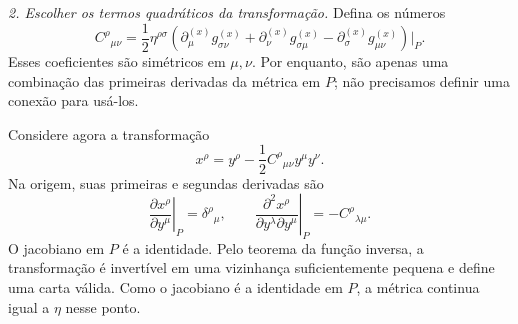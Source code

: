\documentclass[12pt,a4paper,oneside]{book}
\theoremstyle{rgplain}
\theoremstyle{rgremark}
\begin{document}
\emph{2. Escolher os termos quadráticos da transformação.} Defina os
números
\begin{equation}
  C^\rho{}_{\mu\nu}
  =\frac12\eta^{\rho\sigma}
  \left(\partial^{(x)}_\mu g^{(x)}_{\sigma\nu}
       +\partial^{(x)}_\nu g^{(x)}_{\sigma\mu}
       -\partial^{(x)}_\sigma g^{(x)}_{\mu\nu}\right)\Big|_P.
  \label{eq:planura-coeficientes}
\end{equation}
Esses coeficientes são simétricos em $\mu,\nu$. Por enquanto, são apenas uma
combinação das primeiras derivadas da métrica em $P$; não precisamos definir
uma conexão para usá-los.

Considere agora a transformação
\begin{equation}
  x^\rho=y^\rho-\frac12 C^\rho{}_{\mu\nu}y^\mu y^\nu.
  \label{eq:planura-transformacao}
\end{equation}
Na origem, suas primeiras e segundas derivadas são
\[
  \left.\frac{\partial x^\rho}{\partial y^\mu}\right|_P
  =\delta^\rho{}_\mu,
  \qquad
  \left.\frac{\partial^2x^\rho}
  {\partial y^\lambda\partial y^\mu}\right|_P
  =-C^\rho{}_{\lambda\mu}.
\]
O jacobiano em $P$ é a identidade. Pelo teorema da função inversa, a
transformação é invertível em uma vizinhança suficientemente pequena e
define uma carta válida. Como o jacobiano é a identidade em $P$, a métrica
continua igual a $\eta$ nesse ponto.
\end{document}

